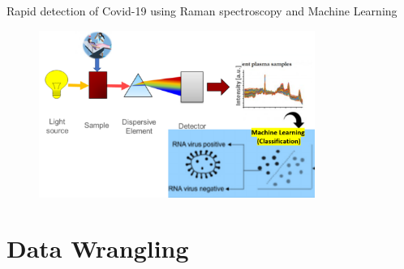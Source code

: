 \begin{frame}{Rapid detection of Covid-19 using Raman spectroscopy and Machine Learning}


	\begin{figure}
		
		\includegraphics[width=9.0cm]{figures/covid_raman_and_ML.png}
	\end{figure}


\end{frame}


\section{Data Wrangling} %

